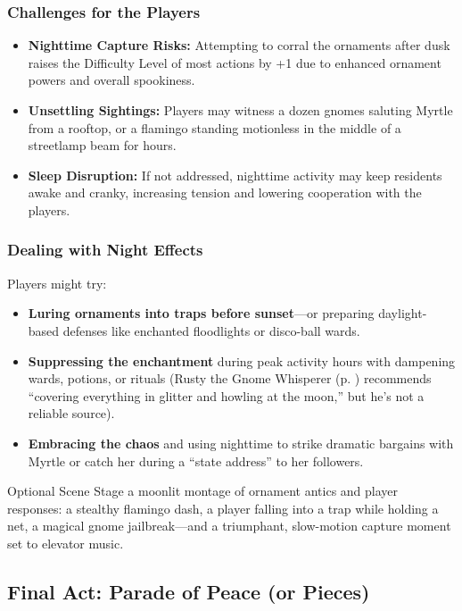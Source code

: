 \begin{multicols}{2}
\subsubsection{Challenges for the Players}
\begin{itemize}
    \item \textbf{Nighttime Capture Risks:} Attempting to corral the ornaments after dusk raises the Difficulty Level of most actions by +1 due to enhanced ornament powers and overall spookiness.
    \item \textbf{Unsettling Sightings:} Players may witness a dozen gnomes saluting Myrtle from a rooftop, or a flamingo standing motionless in the middle of a streetlamp beam for hours.
    \item \textbf{Sleep Disruption:} If not addressed, nighttime activity may keep residents awake and cranky, increasing tension and lowering cooperation with the players.
\end{itemize}

\subsubsection{Dealing with Night Effects}
Players might try:
\begin{itemize}
    \item \textbf{Luring ornaments into traps before sunset}—or preparing daylight-based defenses like enchanted floodlights or disco-ball wards.
    \item \textbf{Suppressing the enchantment} during peak activity hours with dampening wards, potions, or rituals (Rusty the Gnome Whisperer (p. \pageref{npc:rusty-turnbuckle}) recommends “covering everything in glitter and howling at the moon,” but he’s not a reliable source).
    \item \textbf{Embracing the chaos} and using nighttime to strike dramatic bargains with Myrtle or catch her during a “state address” to her followers.
\end{itemize}

\begin{CommentBox}{Optional Scene}
    Stage a moonlit montage of ornament antics and player responses: a stealthy flamingo dash, a player falling into a trap while holding a net, a magical gnome jailbreak—and a triumphant, slow-motion capture moment set to elevator music.
\end{CommentBox}


\subsection{Final Act: Parade of Peace (or Pieces)}


\end{multicols}
